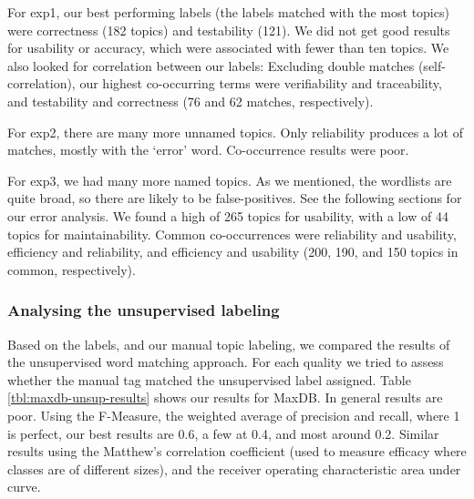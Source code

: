 \documentclass[10pt, conference, compsocconf]{IEEEtran}
\begin{document}
For \textsf{exp1}, our best performing labels (the labels matched with the most topics) were correctness (182 topics) and testability (121). We did not get good results for usability or accuracy, which were associated with fewer than ten topics. We also looked for correlation between our labels: Excluding double matches (self-correlation), our highest co-occurring terms were verifiability and traceability, and testability and correctness (76 and 62 matches, respectively).

For \textsf{exp2}, there are many more unnamed topics. Only reliability produces a lot of matches, mostly with the `error' word. Co-occurrence results were poor.

For \textsf{exp3}, we had many more named topics. As we mentioned, the wordlists are quite broad, so there are likely to be false-positives. See the following sections for our error analysis. We found a high of 265 topics for usability, with a low of 44 topics for maintainability. Common co-occurrences were reliability and usability, efficiency and reliability, and efficiency and usability (200, 190, and 150 topics in common, respectively). 

\subsubsection{Analysing the unsupervised labeling}
Based on the labels, and our manual topic labeling, we compared the results of the unsupervised word matching approach. For each quality we tried to assess whether the manual tag matched the unsupervised label assigned. Table \ref{tbl:maxdb-unsup-results} shows our results for MaxDB. In general results are poor. Using the F-Measure, the weighted average of precision and recall, where 1 is perfect, our best results are 0.6, a few at 0.4, and most around 0.2. Similar results using the Matthew's correlation coefficient (used to measure efficacy where classes are of different sizes), and the receiver operating characteristic area under curve. 
\end{document}
